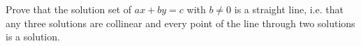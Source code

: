 Prove that the solution set of $ax+by=c$ with $b\ne0$ is a straight line, i.e. that any three solutions are collinear and every point of the line through two solutions is a solution.
